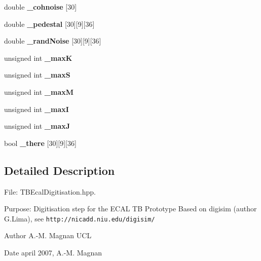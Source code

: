 \begin{DoxyCompactItemize}
\item 
double {\bfseries \-\_\-cohnoise} [30]\label{classCALICE_1_1TBEcalDigitisation_af11a9f75d613c9077daa8769cd5ec06b}

\item 
double {\bfseries \-\_\-pedestal} [30][9][36]\label{classCALICE_1_1TBEcalDigitisation_ae02e0c760c70f05059335e77c52647d2}

\item 
double {\bfseries \-\_\-rand\-Noise} [30][9][36]\label{classCALICE_1_1TBEcalDigitisation_adea189aa203e383959e7f5a6b874f02a}

\item 
unsigned int {\bfseries \-\_\-max\-K}\label{classCALICE_1_1TBEcalDigitisation_a0d656121cf458e7a6b16aac4164da026}

\item 
unsigned int {\bfseries \-\_\-max\-S}\label{classCALICE_1_1TBEcalDigitisation_aa3829ed78b6630d35da95e184cdb7b0d}

\item 
unsigned int {\bfseries \-\_\-max\-M}\label{classCALICE_1_1TBEcalDigitisation_a153190f2befb7bd50fb30562c2034b6b}

\item 
unsigned int {\bfseries \-\_\-max\-I}\label{classCALICE_1_1TBEcalDigitisation_a1630d0ccd95e8488c87b12c40a5896a8}

\item 
unsigned int {\bfseries \-\_\-max\-J}\label{classCALICE_1_1TBEcalDigitisation_a1b1a5768b9e3bcab3c48530aa70b3145}

\item 
bool {\bfseries \-\_\-there} [30][9][36]\label{classCALICE_1_1TBEcalDigitisation_a21752b35f73124def1d96f882e54a50b}

\end{DoxyCompactItemize}


\subsection{Detailed Description}
File\-: T\-B\-Ecal\-Digitisation.\-hpp. 

Purpose\-: Digitisation step for the E\-C\-A\-L T\-B Prototype Based on digisim (author G.\-Lima), see {\tt http\-://nicadd.\-niu.\-edu/digisim/}

\begin{DoxyAuthor}{Author}
A.-\/\-M. Magnan U\-C\-L 
\end{DoxyAuthor}
\begin{DoxyDate}{Date}
april 2007, A.-\/\-M. Magnan 
\end{DoxyDate}


